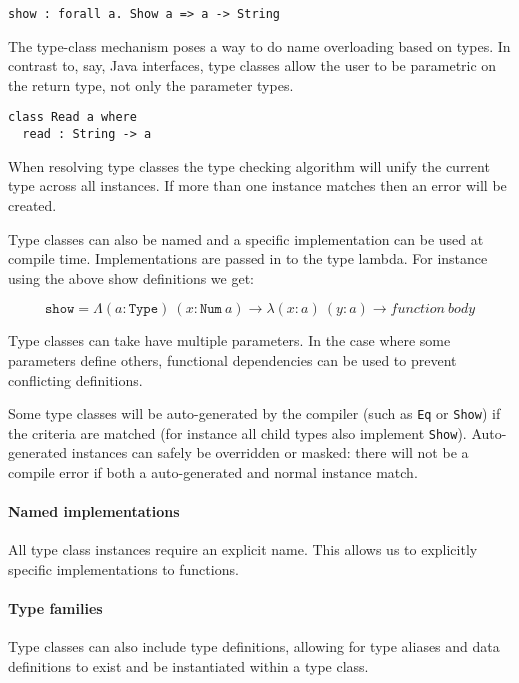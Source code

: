 \begin{verbatim}
show : forall a. Show a => a -> String
\end{verbatim}

The type-class mechanism poses a way to do name overloading based on types. In contrast to, say, Java interfaces, type classes allow the user to be parametric on the return type, not only the parameter types.

\begin{verbatim}
class Read a where
  read : String -> a
\end{verbatim}

When resolving type classes the type checking algorithm will unify the current type across all instances. If more than one instance matches then an error will be created.

Type classes can also be named and a specific implementation can be used at compile time. Implementations are passed in to the type lambda. For instance using the above show definitions we get:

$$
\mathtt{show} = \Lambda (a : \mathtt{Type})\ (x : \mathtt{Num}\ a) \to \lambda (x : a)\ (y : a) \to function\ body
$$

Type classes can take have multiple parameters. In the case where some parameters define others, functional dependencies\cite{funcDeps} can be used to prevent conflicting definitions.

Some type classes will be auto-generated by the compiler (such as \texttt{Eq} or \texttt{Show}) if the criteria are matched (for instance all child types also implement \texttt{Show}). Auto-generated instances can safely be overridden or masked: there will not be a compile error if both a auto-generated and normal instance match.

\paragraph{Named implementations}
All type class instances require an explicit name. This allows us to explicitly specific implementations to functions.

\paragraph{Type families}
Type classes can also include type definitions\cite{typeFams}, allowing for type aliases and data definitions to exist and be instantiated within a type class.
